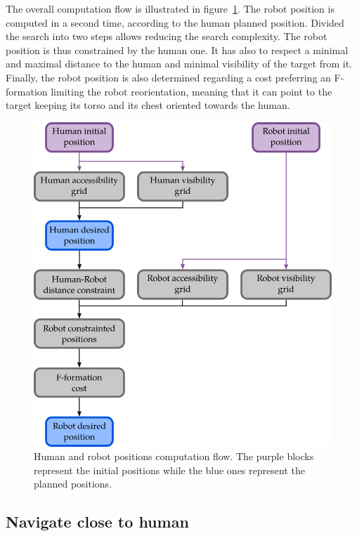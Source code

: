 The overall computation flow is illustrated in figure~\ref{fig:chap8_svp}. The robot position is computed in a second time, according to the human planned position. Divided the search into two steps allows reducing the search complexity. The robot position is thus constrained by the human one. It has also to respect a minimal and maximal distance to the human and minimal visibility of the target from it. Finally, the robot position is also determined regarding a cost preferring an F-formation limiting the robot reorientation, meaning that it can point to the target keeping its torso and its chest oriented towards the human.

\begin{figure}[ht!]
\centering
\includegraphics[scale=0.44]{figures/chapter8/svp.png}
\caption{\label{fig:chap8_svp} Human and robot positions computation flow. The purple blocks represent the initial positions while the blue ones represent the planned positions. }
\end{figure}

\subsection{Navigate close to human}

